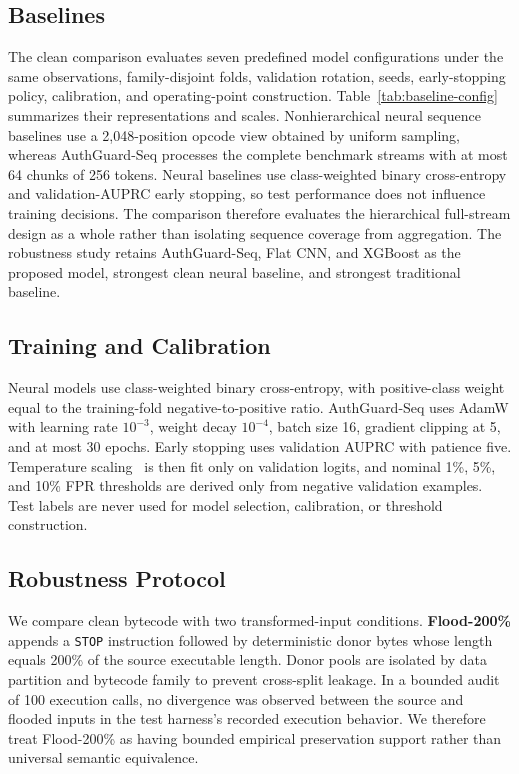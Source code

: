 \documentclass[conference]{IEEEtran}
\newcommand{\code}[1]{\texttt{#1}}
\begin{document}
\subsection{Baselines}

The clean comparison evaluates seven predefined model configurations under the same observations, family-disjoint folds, validation rotation, seeds, early-stopping policy, calibration, and operating-point construction. Table~\ref{tab:baseline-config} summarizes their representations and scales. Nonhierarchical neural sequence baselines use a 2,048-position opcode view obtained by uniform sampling, whereas AuthGuard-Seq processes the complete benchmark streams with at most 64 chunks of 256 tokens. Neural baselines use class-weighted binary cross-entropy and validation-AUPRC early stopping, so test performance does not influence training decisions. The comparison therefore evaluates the hierarchical full-stream design as a whole rather than isolating sequence coverage from aggregation. The robustness study retains AuthGuard-Seq, Flat CNN, and XGBoost as the proposed model, strongest clean neural baseline, and strongest traditional baseline.



\subsection{Training and Calibration}

Neural models use class-weighted binary cross-entropy, with positive-class weight equal to the training-fold negative-to-positive ratio. AuthGuard-Seq uses AdamW with learning rate $10^{-3}$, weight decay $10^{-4}$, batch size 16, gradient clipping at 5, and at most 30 epochs. Early stopping uses validation AUPRC with patience five. Temperature scaling~\cite{guo2017calibration} is then fit only on validation logits, and nominal 1\%, 5\%, and 10\% FPR thresholds are derived only from negative validation examples. Test labels are never used for model selection, calibration, or threshold construction.

\subsection{Robustness Protocol}

We compare clean bytecode with two transformed-input conditions. \textbf{Flood-200\%} appends a \code{STOP} instruction followed by deterministic donor bytes whose length equals 200\% of the source executable length. Donor pools are isolated by data partition and bytecode family to prevent cross-split leakage. In a bounded audit of 100 execution calls, no divergence was observed between the source and flooded inputs in the test harness's recorded execution behavior. We therefore treat Flood-200\% as having bounded empirical preservation support rather than universal semantic equivalence.
\end{document}
